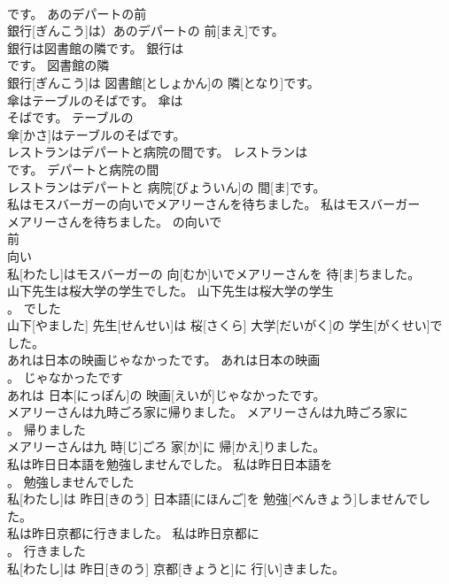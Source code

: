 \documentclass[8pt]{extreport}
\begin{document}
\begin{CJK}{UTF8}{min}
\\	です。	あのデパートの前	
\\	銀行[ぎんこう]は）あのデパートの 前[まえ]です。	
\\	銀行は図書館の隣です。	銀行は
\\	です。	図書館の隣	
\\	銀行[ぎんこう]は 図書館[としょかん]の 隣[となり]です。	
\\	傘はテーブルのそばです。	傘は
\\	そばです。	テーブルの	
\\	傘[かさ]はテーブルのそばです。	
\\	レストランはデパートと病院の間です。	レストランは
\\	です。	デパートと病院の間	
\\	レストランはデパートと 病院[びょういん]の 間[ま]です。	
\\	私はモスバーガーの向いでメアリーさんを待ちました。	私はモスバーガー
\\	メアリーさんを待ちました。	の向いで	
\\	前 
\\	向い　
\\	私[わたし]はモスバーガーの 向[むか]いでメアリーさんを 待[ま]ちました。	
\\	山下先生は桜大学の学生でした。	山下先生は桜大学の学生
\\	。	でした	
\\	山下[やました] 先生[せんせい]は 桜[さくら] 大学[だいがく]の 学生[がくせい]でした。	
\\	あれは日本の映画じゃなかったです。	あれは日本の映画
\\	。	じゃなかったです	
\\	あれは 日本[にっぽん]の 映画[えいが]じゃなかったです。	
\\	メアリーさんは九時ごろ家に帰りました。	メアリーさんは九時ごろ家に
\\	。	帰りました	
\\	メアリーさんは九 時[じ]ごろ 家[か]に 帰[かえ]りました。	
\\	私は昨日日本語を勉強しませんでした。	私は昨日日本語を
\\	。	勉強しませんでした	
\\	私[わたし]は 昨日[きのう] 日本語[にほんご]を 勉強[べんきょう]しませんでした。	
\\	私は昨日京都に行きました。	私は昨日京都に
\\	。	行きました	
\\	私[わたし]は 昨日[きのう] 京都[きょうと]に 行[い]きました。	

\end{CJK}
\end{document}
